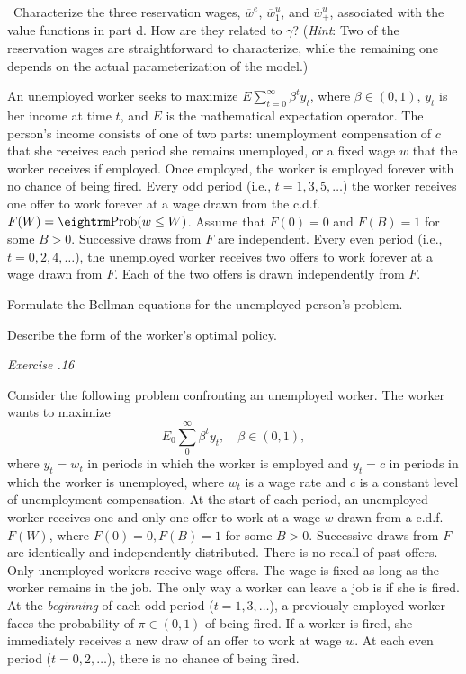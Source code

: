 \medskip
{} \ Characterize the three reservation wages,
$\overline w^e$, $\overline w^u_1$, and $\overline w^u_+$, associated
with the value functions in part d. How are they related to $\gamma$?
({\it Hint}: Two of the reservation wages are straightforward to
characterize, while the
remaining one depends on the actual parameterization of the model.)


\medskip
{} 
\medskip
\noindent
 An unemployed worker seeks
to maximize $E \sum_{t=0}^\infty \beta^t y_t$, where
$\beta \in (0,1)$, $y_t$ is her income at time $t$, and $E$ is
the mathematical expectation operator.  The person's
income consists of one of  two parts: unemployment compensation of
$c$ that she receives each period  she remains unemployed, or
a fixed wage $w$ that  the worker receives if employed. Once employed,
the worker is employed forever with no chance of being fired.
Every odd period (i.e., $t = 1, 3, 5, \ldots$) the worker
receives one offer to work  forever at a wage drawn from
the c.d.f. $F(W) = {\rm Prob} (w \leq W)$.  Assume that
$F(0) = 0$ and $F(B) = 1$ for some $B >0$. Successive
draws from $F$ are independent.  Every  even    period (i.e.,
$t=0, 2, 4, \ldots$),
the unemployed worker receives two offers to work forever
at a wage  drawn from $F$.   Each of the two offers is drawn
independently from $F$.


\medskip
{}  Formulate the Bellman equations for the unemployed
person's problem.

\medskip
{}  Describe the form of the worker's optimal
policy.


\medskip\noindent
{\it Exercise \the\chapternum.16} 

\medskip\noindent
  Consider the following problem
confronting an unemployed worker.  The worker wants
to maximize
$$ E_0 \sum_0^\infty \beta^t y_t, \quad \beta \in (0,1), $$
where $y_t = w_t$ in periods in which the worker is employed
and $y_t=c$ in periods in which the worker is unemployed, where
$w_t$ is a wage rate and $c$ is a constant level of unemployment
compensation.  At the start of  each period,
 an unemployed worker receives one and only
one offer to work at a wage $w$ drawn from
a c.d.f. $F(W)$, where $F(0) = 0, F(B) = 1$ for some
$B >0$.   Successive draws from $F$ are identically and
independently distributed.  There is no recall of past offers.
Only unemployed workers receive wage offers.  The wage is
fixed as long as the worker remains in the job.  The only
way a worker can leave a job is if she is fired.
  At the {\it beginning\/}
of each odd period ($t= 1, 3, \ldots$), a previously
employed worker faces the probability of $\pi \in (0,1)$
of being fired.  If a worker is fired,
she immediately receives a new draw of an offer to
work at wage $w$.      At each even period
($t=0, 2, \ldots$), there is no chance of being fired.

